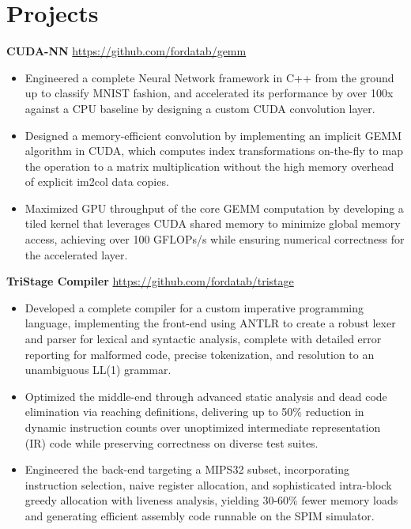 \documentclass[11pt]{article}       %
\begin{document}
\vspace{-18.5pt}

\section*{Projects}


\textbf{CUDA-NN} \hfill \href{https://github.com/fordatab/gemm}{https://github.com/fordatab/gemm} \
\vspace{-10pt}
\begin{itemize}
\item Engineered a complete Neural Network framework in C++ from the ground up to classify MNIST fashion, and accelerated its performance by over 100x against a CPU baseline by designing  a custom CUDA convolution layer.
\item Designed a memory-efficient convolution by implementing an implicit GEMM algorithm in CUDA, which computes index transformations on-the-fly to map the operation to a matrix multiplication without the high memory overhead of explicit im2col data copies.
\item Maximized GPU throughput of the core GEMM computation by developing a tiled kernel that leverages CUDA shared memory to minimize global memory access, achieving over 100 GFLOPs/s while ensuring numerical correctness for the accelerated layer.
\end{itemize}

\textbf{TriStage Compiler} \hfill \href{https://github.com/fordatab/tristage}{https://github.com/fordatab/tristage} \
\vspace{-10pt}
\begin{itemize}
\item Developed a complete compiler for a custom imperative programming language, implementing the front-end using ANTLR to create a robust lexer and parser for lexical and syntactic analysis, complete with detailed error reporting for malformed code, precise tokenization, and resolution to an unambiguous LL(1) grammar.
\item Optimized the middle-end through advanced static analysis and dead code elimination via reaching definitions, delivering up to 50\% reduction in dynamic instruction counts over unoptimized intermediate representation (IR) code while preserving correctness on diverse test suites.
\item Engineered the back-end targeting a MIPS32 subset, incorporating instruction selection, naive register allocation, and sophisticated intra-block greedy allocation with liveness analysis, yielding 30-60\% fewer memory loads and generating efficient assembly code runnable on the SPIM simulator. 
\end{itemize}
\end{document}
